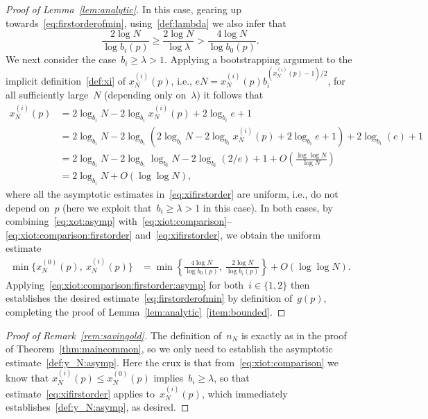 \documentclass{article}
\newcommand\lrpar[1]{\left(#1\right)}
\newcommand{\xot}{x^{(0)}}
\newcommand\bigcpar[1]{\bigl\{#1\bigr\}}
\begin{document}
\begin{proof}[Proof of Lemma~\ref{lem:analytic}]
In this case, gearing up towards~\eqref{eq:firstorderofmin}, using~\eqref{def:lambda} we also infer that 
\begin{equation} \label{eq:xiot:comparison:firstorder}
\frac{2\log N}{\log b_i(p)}\ge \frac{2\log N}{\log \lambda} >\frac{4\log N}{\log b_0(p)}.
\end{equation}
We next consider the case~$b_i\ge \lambda > 1$.
Applying a bootstrapping argument to the implicit definition~\eqref{def:xi} of $x^{(i)}_N(p)$, i.e., $eN=x^{(i)}_N(p) b_i^{(x^{(i)}_N(p)-1)/2}$, 
for all sufficiently large~$N$ (depending only on~$\lambda$) 
it follows that
\begin{equation}\label{eq:xifirstorder}
\begin{split}
     x^{(i)}_N(p)&=2\log_{b_i}N -2\log_{b_i} x^{(i)}_N(p)+2\log_{b_i} e +1\\
    &= 2\log_{b_i}N -2\log_{b_i}(2\log_{b_i}N -2\log_{b_i} x^{(i)}_N(p)+2\log_{b_i} e +1)+2\log_{b_i} (e)+1
        \\
    &= 2\log_{b_i}N -2\log_{b_i}\log_{b_i}N-2\log_{b_i} (2/e)+1 +O\lrpar{\frac{\log\log N}{\log N}} \\
    & = 2\log_{b_i}N + O(\log \log N) , 
\end{split}
\end{equation}
where all the asymptotic estimates in~\eqref{eq:xifirstorder} are uniform, i.e., do not depend on~$p$ (here we exploit that~${b_i \ge \lambda > 1}$ in this case).
In both cases,
by combining~\eqref{eq:xot:asymp} with~\eqref{eq:xiot:comparison}--\eqref{eq:xiot:comparison:firstorder} and~\eqref{eq:xifirstorder}, we obtain the uniform estimate 
\begin{equation}
\label{eq:xiot:comparison:firstorder:asymp}
\begin{split}
\min \bigcpar{\xot_N(p),\: x^{(i)}_N(p)} 
& = \min \left\{ \frac{4\log N}{\log b_0(p)},\: \frac{2\log N}{\log b_i(p)} \right\} + O(\log\log N) .
\end{split}
\end{equation}
Applying~\eqref{eq:xiot:comparison:firstorder:asymp} for both~$i \in \{1,2\}$ then establishes the desired  estimate~\eqref{eq:firstorderofmin} by definition of~$g(p)$, 
completing the proof of Lemma~\ref{lem:analytic}~\ref{item:bounded}. 
\end{proof}



\begin{proof}[Proof of Remark~\ref{rem:savingold}]
The definition of~$n_N$ is exactly as in the proof of Theorem~\ref{thm:maincommon}, 
so we only need to establish the asymptotic estimate~\eqref{def:y_N:asymp}.
Here the crux is that from~\eqref{eq:xiot:comparison} we know that $x^{(i)}_N(p) \leq x^{(0)}_N(p)$ implies~$b_i \ge \lambda$, 
so that estimate~\eqref{eq:xifirstorder} applies to~$x^{(i)}_N(p)$, 
which immediately establishes~\eqref{def:y_N:asymp}, as desired. 
\end{proof}
\end{document}
